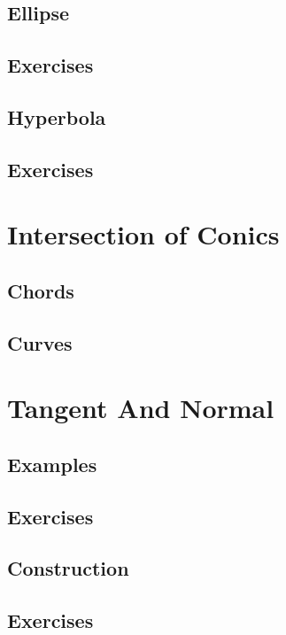 \documentclass[11pt]{book}
\begin{document}
\section{Ellipse}

\section{Exercises}

\section{Hyperbola}

\section{Exercises}


\chapter{Intersection of Conics}
\section{Chords }

\section{Curves}

%
\chapter{Tangent And Normal}
\section{Examples}

\section{Exercises}

\section{Construction}

\section{Exercises}

\fi
\end{document}
